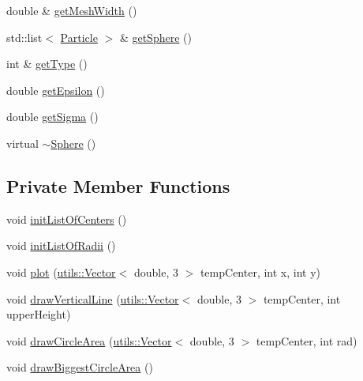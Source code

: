 \begin{DoxyCompactItemize}
\item 
double \& \hyperlink{classSphere_a8796dba65ece80813b560fefdebf3ed0}{get\-Mesh\-Width} ()
\item 
std\-::list$<$ \hyperlink{classParticle}{Particle} $>$ \& \hyperlink{classSphere_a8d8082fba50dadba0afc58877d126603}{get\-Sphere} ()
\item 
int \& \hyperlink{classSphere_a5023edd8787a02cb96bfc4ce9d6f3335}{get\-Type} ()
\item 
double \hyperlink{classSphere_a647815fa5959a710a15b3b58b1748326}{get\-Epsilon} ()
\item 
double \hyperlink{classSphere_ade101a82ae3fa2c93969f0316dc8ec9c}{get\-Sigma} ()
\item 
virtual \hyperlink{classSphere_a569c071e50a3e11f678630ee1a17737e}{$\sim$\-Sphere} ()
\end{DoxyCompactItemize}
\subsection*{Private Member Functions}
\begin{DoxyCompactItemize}
\item 
void \hyperlink{classSphere_a0c92cd51e271f64c97c96fc5f4d775a8}{init\-List\-Of\-Centers} ()
\item 
void \hyperlink{classSphere_acbe46e167b61e7b1d1fb4b80ad45f386}{init\-List\-Of\-Radii} ()
\item 
void \hyperlink{classSphere_add9cb3b5fc594012c8e0f64556db02f9}{plot} (\hyperlink{classutils_1_1Vector}{utils\-::\-Vector}$<$ double, 3 $>$ temp\-Center, int x, int y)
\item 
void \hyperlink{classSphere_a7069d3583fbb47c93d825306df9f2f4c}{draw\-Vertical\-Line} (\hyperlink{classutils_1_1Vector}{utils\-::\-Vector}$<$ double, 3 $>$ temp\-Center, int upper\-Height)
\item 
void \hyperlink{classSphere_ac81f8d066b948468d700047994934eda}{draw\-Circle\-Area} (\hyperlink{classutils_1_1Vector}{utils\-::\-Vector}$<$ double, 3 $>$ temp\-Center, int rad)
\item 
void \hyperlink{classSphere_a208034eeb2308ab02ca8ea36d23f45af}{draw\-Biggest\-Circle\-Area} ()
\end{DoxyCompactItemize}
